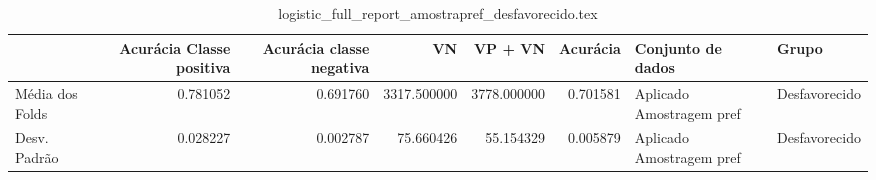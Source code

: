 \begin{table}
\centering
\caption{logistic_full_report_amostrapref_desfavorecido.tex}
\label{logistic_full_report_amostrapref_desfavorecido.tex}
\begin{tabular}{lrrrrrll}
\toprule
{}              &  Acurácia Classe positiva &  Acurácia classe negativa &          VN  &     VP + VN  &  Acurácia &         Conjunto de dados &          Grupo \\
\midrule
Média dos Folds &                  0.781052 &                  0.691760 &  3317.500000 &  3778.000000 &  0.701581 &  Aplicado Amostragem pref &  Desfavorecido \\
Desv. Padrão    &                  0.028227 &                  0.002787 &    75.660426 &    55.154329 &  0.005879 &  Aplicado Amostragem pref &  Desfavorecido \\
\bottomrule
\end{tabular}
\end{table}
